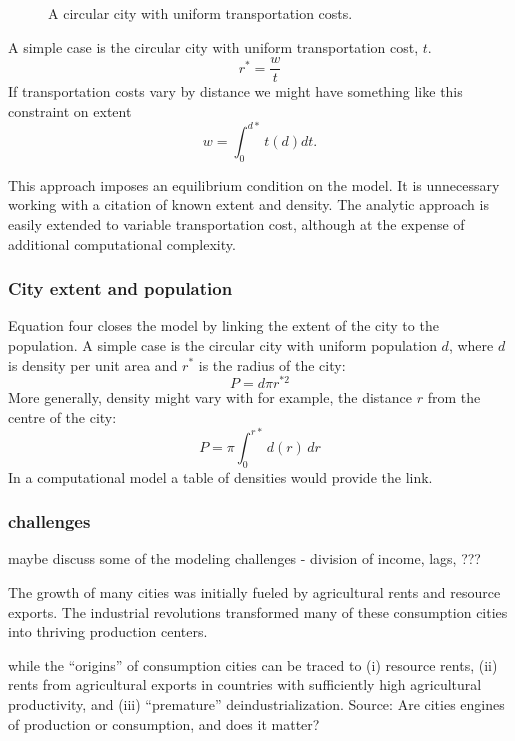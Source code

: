 \begin{figure}
    \begin{center}
    
    \caption{A circular city with uniform transportation costs.}
    \label{fig-rent-alonzo}
    \end{center}
\end{figure}

A simple case is the circular city with uniform transportation cost, $t$. \[r^*= \frac{w}{t}\]%
If transportation costs vary by  distance we might have something like this constraint on extent\[w=\int_0^{d*} t(d)dt.\]

This approach imposes an equilibrium condition on the model. It is unnecessary working with a citation of known extent and density. The analytic approach is easily extended to variable transportation cost, although at the expense of additional computational complexity.

\subsubsection{City extent and population}
Equation  four  closes the model by linking the extent of the city to the population. A simple case is the circular city with uniform population $d$, where $d$ is density per unit area and $r^*$ is the radius of the city: \[P=d\pi r^{*2}\] 
More generally, density might vary with for example, the distance $r$ from the centre of the city:
\[P=\pi \int_{0}^{r*}d(r)\,dr\] 
In a computational model a table of densities would provide the link.


\subsubsection{challenges}
maybe discuss some of the modeling challenges - division of income, lags, ???

\color{black}


\vspace{2cm}


\color{green}
 The growth of many cities was initially fueled by agricultural rents and resource exports. The industrial revolutions transformed many of these consumption cities into thriving production centers. 

while the ``origins'' of consumption cities can be traced to (i)
resource rents, (ii) rents from agricultural exports in countries with sufficiently high agricultural productivity, and (iii) ``premature'' deindustrialization.  Source:
{Are cities engines of production or consumption, and does it matter?}




